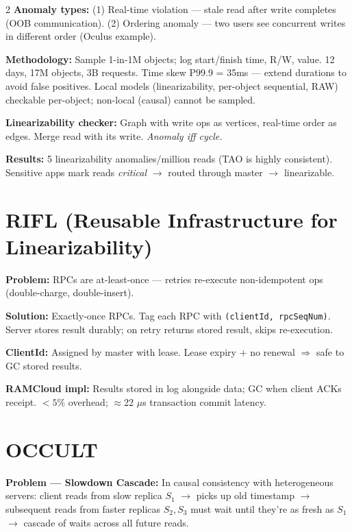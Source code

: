 \documentclass[9pt]{article}
\begin{document}
\begin{multicols*}{2}
\textbf{Anomaly types:} (1) Real-time violation — stale read after write completes (OOB communication). (2) Ordering anomaly — two users see concurrent writes in different order (Oculus example).

\textbf{Methodology:} Sample 1-in-1M objects; log start/finish time, R/W, value. 12 days, 17M objects, 3B requests. Time skew P99.9 = 35ms — extend durations to avoid false positives. Local models (linearizability, per-object sequential, RAW) checkable per-object; non-local (causal) cannot be sampled.

\textbf{Linearizability checker:} Graph with write ops as vertices, real-time order as edges. Merge read with its write. \emph{Anomaly iff cycle.}

\textbf{Results:} 5 linearizability anomalies/million reads (TAO is highly consistent). Sensitive apps mark reads \emph{critical} $\to$ routed through master $\to$ linearizable.

\section*{RIFL (Reusable Infrastructure for Linearizability)}

\textbf{Problem:} RPCs are at-least-once — retries re-execute non-idempotent ops (double-charge, double-insert).

\textbf{Solution:} Exactly-once RPCs. Tag each RPC with \texttt{(clientId, rpcSeqNum)}. Server stores result durably; on retry returns stored result, skips re-execution.

\textbf{ClientId:} Assigned by master with lease. Lease expiry + no renewal $\Rightarrow$ safe to GC stored results.

\textbf{RAMCloud impl:} Results stored in log alongside data; GC when client ACKs receipt. $<5\%$ overhead; $\approx$22 $\mu$s transaction commit latency.

\section*{OCCULT}

\textbf{Problem — Slowdown Cascade:} In causal consistency with heterogeneous servers: client reads from slow replica $S_1$ $\to$ picks up old timestamp $\to$ subsequent reads from faster replicas $S_2, S_3$ must wait until they're as fresh as $S_1$ $\to$ cascade of waits across all future reads.


\end{multicols*}
\end{document}
